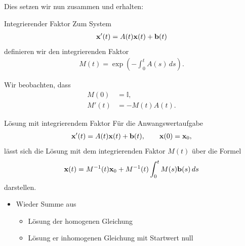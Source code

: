 \begin{frame}%
  Dies setzen wir nun zusammen und erhalten:
  \begin{block}{Integrierender Faktor}
    Zum System
    \begin{gather*}
      \mathbf{x}'(t) = A(t) \mathbf{x}(t) + \mathbf{b}(t)
    \end{gather*}
    definieren wir den integrierenden Faktor
    \begin{gather*}
      M(t) = \exp\left(-\int_0^t A(s) \,ds\right).
    \end{gather*}
  \end{block}
  Wir beobachten, dass
  \begin{align*}
    M(0) &= \mathbb I,\\
    M'(t) &= -M(t) A(t).
  \end{align*}
\end{frame}

\begin{frame}
  \begin{block}{Lösung mit integrierendem Faktor}
    Für die Anwangswertaufgabe
    \begin{gather*}
      \mathbf{x}'(t) = A(t)\mathbf{x}(t)+ \mathbf{b}(t),
      \qquad
      \mathbf{x}(0) = \mathbf{x}_0,
    \end{gather*}
    lässt sich die Lösung mit dem integrierenden Faktor $M(t)$ über die Formel
    \begin{gather*}
      \mathbf{x}(t) = M^{-1}(t) \mathbf{x}_0 + M^{-1}(t) \int_0^t M(s) \mathbf{b}(s) \,ds
    \end{gather*}
    darstellen.
  \end{block}
  \begin{itemize}
  \item Wieder Summe aus
    \begin{itemize}
    \item Lösung der homogenen Gleichung
    \item Lösung er inhomogenen Gleichung mit Startwert null
    \end{itemize}
  \end{itemize}
\end{frame}

